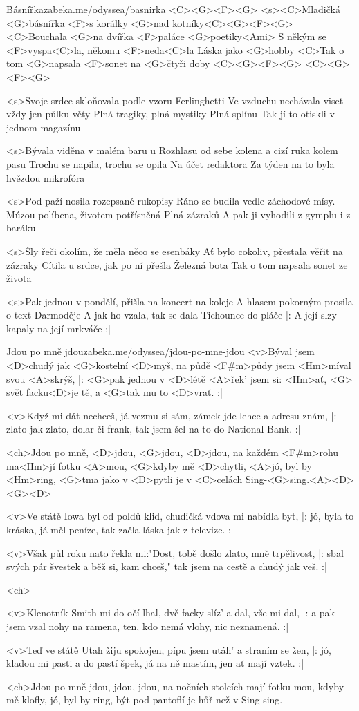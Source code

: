 \begin{song}{32}{Básnířka}{zabeka.me/odyssea/basnirka}
<C><G><F><G>
<s><C>Mladičká <G>básnířka <F>s korálky <G>nad kotníky<C><G><F><G>
<C>Bouchala <G>na dvířka <F>paláce <G>poetiky<Ami>
S někým se <F>vyspa<C>la, někomu <F>neda<C>la
Láska jako <G>hobby
<C>Tak o tom <G>napsala <F>sonet na <G>čtyři doby
<C><G><F><G>
<C><G><F><G>

<s>Svoje srdce skloňovala podle vzoru Ferlinghetti
Ve vzduchu nechávala viset vždy jen půlku věty
Plná tragiky, plná mystiky
Plná splínu
Tak jí to otiskli v jednom magazínu

<s>Bývala viděna v malém baru u Rozhlasu
od sebe kolena a cizí ruka kolem pasu
Trochu se napila, trochu se opila
Na účet redaktora
Za týden na to byla hvězdou mikrofóra

<s>Pod paží nosila rozepsané rukopisy
Ráno se budila vedle záchodové mísy.
Múzou políbena, životem potřísněná
Plná zázraků
A pak ji vyhodili z gymplu i z baráku

<s>Šly řeči okolím, že měla něco se esenbáky
Ať bylo cokoliv, přestala věřit na zázraky
Cítila u srdce, jak po ní přešla
Železná bota
Tak o tom napsala sonet ze života

<s>Pak jednou v pondělí, přišla na koncert na koleje
A hlasem pokorným prosila o text Darmoděje
A jak ho vzala, tak se dala
Tichounce do pláče
|: A její slzy kapaly na její mrkváče :| 

\end{song}
\begin{song}{33}{Jdou po mně jdou}{zabeka.me/odyssea/jdou-po-mne-jdou}
<v>Býval jsem <D>chudý jak <G>kostelní <D>myš,
na půdě <F#m>půdy jsem <Hm>míval svou <A>skrýš,
|: <G>pak jednou v <D>létě <A>řek' jsem si: <Hm>ať,
<G> svět facku<D>je tě, a <G>tak mu to <D>vrať. :|

<v>Když mi dát nechceš, já vezmu si sám,
zámek jde lehce a adresu znám,
|: zlato jak zlato, dolar či frank,
tak jsem šel na to do National Bank. :|

<ch>Jdou po mně, <D>jdou, <G>jdou, <D>jdou,
na každém <F#m>rohu ma<Hm>jí fotku <A>mou,
<G>kdyby mě <D>chytli, <A>jó, byl by <Hm>ring,
<G>tma jako v <D>pytli je v <C>celách Sing-<G>sing.<A><D> <G><D>

<v>Ve státě Iowa byl od poldů klid,
chudičká vdova mi nabídla byt,
|: jó, byla to kráska, já měl peníze,
tak začla láska jak z televize. :|

<v>Však půl roku nato řekla mi:"Dost,
tobě došlo zlato, mně trpělivost,
|: sbal svých pár švestek a běž si, kam chceš,"
tak jsem na cestě a chudý jak veš. :|

<ch>

<v>Klenotník Smith mi do očí lhal,
dvě facky slíz' a dal, vše mi dal,
|: a pak jsem vzal nohy na ramena,
ten, kdo nemá vlohy, nic neznamená. :|

<v>Teď ve státě Utah žiju spokojen,
pípu jsem utáh' a straním se žen,
|: jó, kladou mi pasti a do pastí špek,
já na ně mastím, jen ať mají vztek. :|

<ch>Jdou po mně jdou, jdou, jdou,
na nočních stolcích mají fotku mou,
kdyby mě klofly, jó, byl by ring,
být pod pantoflí je hůř než v Sing-sing.
\end{song}
